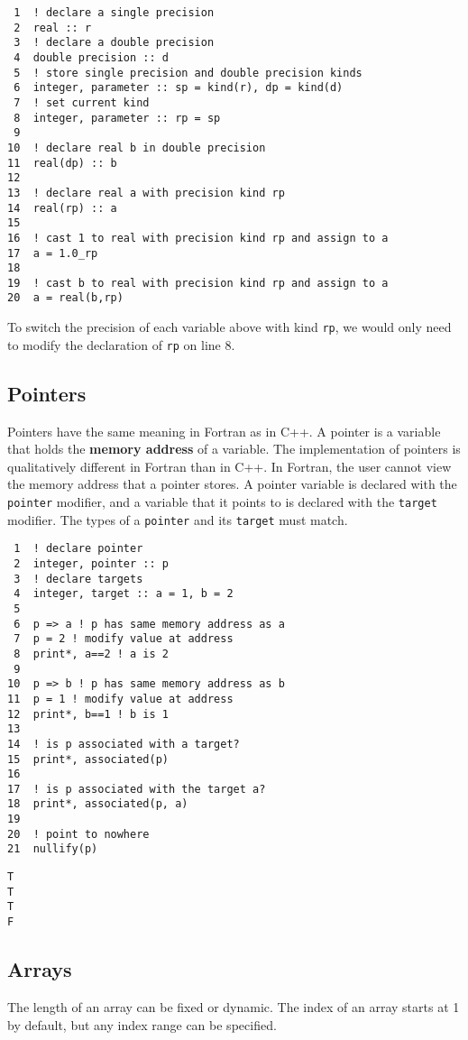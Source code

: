 \documentclass[11pt]{article}
\begin{document}
\begin{verbatim}
 1  ! declare a single precision
 2  real :: r 
 3  ! declare a double precision
 4  double precision :: d
 5  ! store single precision and double precision kinds
 6  integer, parameter :: sp = kind(r), dp = kind(d)
 7  ! set current kind
 8  integer, parameter :: rp = sp
 9  
10  ! declare real b in double precision
11  real(dp) :: b
12  
13  ! declare real a with precision kind rp
14  real(rp) :: a
15  
16  ! cast 1 to real with precision kind rp and assign to a
17  a = 1.0_rp
18  
19  ! cast b to real with precision kind rp and assign to a
20  a = real(b,rp)
\end{verbatim}

To switch the precision of each variable above with kind \texttt{rp}, we would only need to modify the declaration of \texttt{rp} on line 8.

\subsection{Pointers}
\label{sec:orgheadline19}
Pointers have the same meaning in Fortran as in C++. A pointer is a variable that holds the \textbf{memory address} of a variable. The implementation of pointers is qualitatively different in Fortran than in C++. In Fortran, the user cannot view the memory address that a pointer stores. A pointer variable is declared with the \texttt{pointer} modifier, and a variable that it points to is declared with the \texttt{target} modifier. The types of a \texttt{pointer} and its \texttt{target} must match.

\begin{verbatim}
 1  ! declare pointer
 2  integer, pointer :: p
 3  ! declare targets
 4  integer, target :: a = 1, b = 2
 5  
 6  p => a ! p has same memory address as a
 7  p = 2 ! modify value at address
 8  print*, a==2 ! a is 2
 9  
10  p => b ! p has same memory address as b
11  p = 1 ! modify value at address
12  print*, b==1 ! b is 1
13  
14  ! is p associated with a target?
15  print*, associated(p)
16  
17  ! is p associated with the target a?
18  print*, associated(p, a)
19  
20  ! point to nowhere
21  nullify(p)
\end{verbatim}

\begin{verbatim}
T
T
T
F
\end{verbatim}

\subsection{Arrays}
\label{sec:orgheadline22}
The length of an array can be fixed or dynamic. The index of an array starts at 1 by default, but any index range can be specified.
\end{document}
